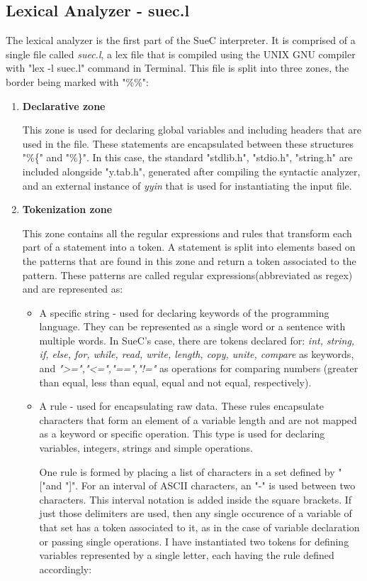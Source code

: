 \documentclass[12pt,a4paper,twoside]{report}
\begin{document}
\subsection{Lexical Analyzer - suec.l}

The lexical analyzer is the first part of the SueC interpreter. It is comprised of a single file called \textit{suec.l}, a lex file that is compiled using the UNIX GNU compiler with "lex -l suec.l" command in Terminal. This file is split into three zones, the border being marked with "\%\%":
\begin{enumerate}
	\item \textbf{Declarative zone}
	
	This zone is used for declaring global variables and including headers that are used in the file. These statements are encapsulated between these structures "\%\{" and "\%\}". In this case, the standard "stdlib.h", "stdio.h", "string.h" are included alongside "y.tab.h", generated after compiling the syntactic analyzer, and an external instance of \textit{yyin} that is used for instantiating the input file.
	
	\item \textbf{Tokenization zone}
	
	This zone contains all the regular expressions and rules that transform each part of a statement into a token. A statement is split into elements based on the patterns that are found in this zone and return a token associated to the pattern.
	These patterns are called regular expressions(abbreviated as regex) and are represented as:
	\begin{itemize}
		\item A specific string - used for declaring keywords of the programming language. They can be represented as a single word or a sentence with multiple words. In SueC's case, there are tokens declared for: \textit{int, string, if, else, for, while, read, write, length, copy, unite, compare} as keywords, and \textit{">=","<=","==","!="} as operations for comparing numbers (greater than equal, less than equal, equal and not equal, respectively).
		\item A rule - used for encapsulating raw data. These rules encapsulate characters that form an element of a variable length and are not mapped as a keyword or specific operation. This type is used for declaring variables, integers, strings and simple operations. 
		
		One rule is formed by placing a list of characters in a set defined by "["and "]". For an interval of ASCII characters, an "-" is used between two characters. This interval notation is added inside the square brackets. If just those delimiters are used, then any single occurence of a variable of that set has a token associated to it, as in the case of variable declaration or passing single operations. I have instantiated two tokens for defining variables represented by a single letter, each having the rule defined accordingly:
		

\end{itemize}
\end{enumerate}
\end{document}
